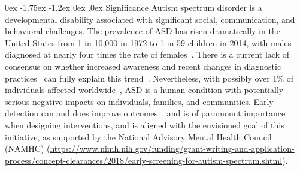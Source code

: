 \documentclass[onecolumn, compsoc,11pt]{IEEEtran}
\makeatletter
\renewcommand\subsection{\@startsection {subsection}{2}{\z@}%
                                   {0ex \@plus -1.75ex \@minus -1.2ex}%
                                   {0ex \@plus.0ex}%
                                   {\fontsize{11}{11}\selectfont\bfseries\sffamily\color{black}}}
\makeatother
\begin{document}
\subsection{Significance}
Autism spectrum disorder is a developmental disability associated with significant social, communication, and behavioral challenges.  The prevalence of ASD  has risen dramatically in the United States from 1 in 10,000 in
 1972 to 1 in 59 children in 2014, with males  diagnosed at nearly four times the rate of females~\cite{pmid29701730,cdc}.
There is a current lack of   consensus on whether increased awareness and recent changes in diagnostic practices~\cite{hyman2020identification} can fully explain this  trend~\cite{pmid19737791}. Nevertheless, with   possibly  over 1\% of individuals affected worldwide~\cite{pmid22495912},  ASD is  a human condition with potentially serious negative impacts on individuals, families, and communities. 
Early detection can and does improve outcomes~\cite{hyman2020identification}, and is of paramount importance when designing interventions, and is aligned with the  envisioned goal of this initiative, as supported by the National Advisory Mental Health Council (NAMHC) (\href{https://www.nimh.nih.gov/funding/grant-writing-and-application-process/concept-clearances/2018/early-screening-for-autism-spectrum.shtml}{https://www.nimh.nih.gov/funding/grant-writing-and-application-process/concept-clearances/2018/early-screening-for-autism-spectrum.shtml}).
\end{document}
